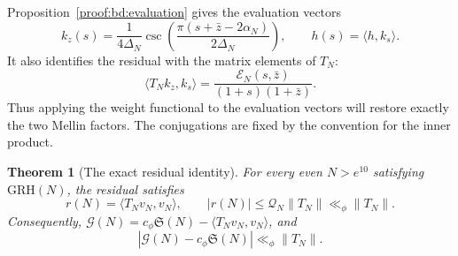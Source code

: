 \documentclass[12pt,a4paper]{amsart}
\numberwithin{equation}{section}
\def\le{\leqslant}
\theoremstyle{plain}
\newtheorem{theorem}{Theorem}[section]
\theoremstyle{definition}
\theoremstyle{remark}
\begin{document}
Proposition~\ref{proof:bd:evaluation} gives the evaluation vectors
\[
 k_z(s)=\frac1{4\Delta_N}
       \csc\!\left(\frac{\pi(s+\bar z-2\alpha_N)}{2\Delta_N}\right),
 \qquad h(s)=\langle h,k_s\rangle.
\]
It also identifies the residual with the matrix elements of $T_N$:
\[
 \langle T_Nk_z,k_s\rangle
       =\frac{\mathscr E_N(s,\bar z)}{(1+s)(1+\bar z)}.
\]
Thus applying the weight functional to the evaluation vectors will
restore exactly the two Mellin factors. The conjugations are fixed
by the convention for the inner product.

\begin{theorem}[The exact residual identity]\label{proof:bm:quadratic}
For every even $N>e^{10}$ satisfying $\mathrm{GRH}(N)$, the residual
satisfies
\begin{equation}\label{proof:hardy:quadratic-bound}
 r(N)=\langle T_Nv_N,v_N\rangle,
 \qquad |r(N)|\le\mathcal Q_N\|T_N\|\ll_\phi\|T_N\|.
\end{equation}
Consequently,
$\mathcal G(N)=c_\phi\mathfrak S(N)-\langle T_Nv_N,v_N\rangle$, and
\begin{equation}\label{proof:hardy:goldbach-error}
 |\mathcal G(N)-c_\phi\mathfrak S(N)|\ll_\phi\|T_N\|.
\end{equation}
\end{theorem}
\end{document}
